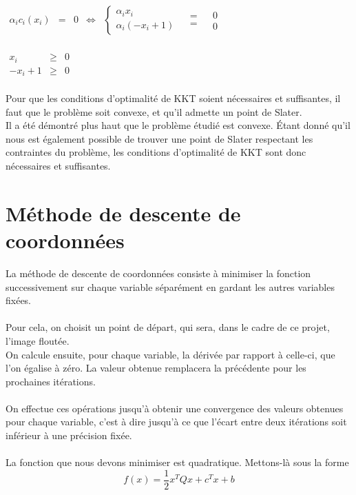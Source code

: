 \documentclass[12pt, a4paper]{report}
\begin{document}
\begin{center}
$\begin{array}{rclcrll}
\alpha_i c_i(x_i) & = & 0 & \Leftrightarrow & \left\{\begin{array}{l} \alpha_i x_i \\ \alpha_i(- x_i +1)\end{array}\right. & \begin{array}{c} = \\ = \end{array} & \begin{array}{l} 0 \\ 0 \end{array}\\
\end{array}$
\end{center}

\begin{center}
$\begin{array}{rcl}
x_i & \geq & 0 \\
-x_i + 1 & \geq & 0 \\
\end{array}$
\end{center}
\noindent
Pour que les conditions d'optimalité de KKT soient nécessaires et suffisantes, il faut que le problème soit convexe, et qu'il admette un point de Slater.\\
Il a été démontré plus haut que le problème étudié est convexe. Étant donné qu'il nous est également possible de trouver une point de Slater respectant les contraintes du problème, les conditions d'optimalité de KKT sont donc nécessaires et suffisantes.
 
\section{Méthode de descente de coordonnées}
La méthode de descente de coordonnées consiste à minimiser la fonction successivement sur chaque variable séparément en gardant les autres variables fixées.\\
\\Pour cela, on choisit un point de départ, qui sera, dans le cadre de ce projet, l'image floutée.\\
On calcule ensuite, pour chaque variable, la dérivée par rapport à celle-ci, que l'on égalise à zéro. La valeur obtenue remplacera la précédente pour les prochaines itérations. \\
\\On effectue ces opérations jusqu'à obtenir une convergence des valeurs obtenues pour chaque variable, c'est à dire jusqu'à ce que l'écart entre deux itérations soit inférieur à une précision fixée. \\
\\La fonction que nous devons minimiser est quadratique. Mettons-là sous la forme \[f(x) = \dfrac{1}{2}x^TQx + c^Tx + b\]
\end{document}
